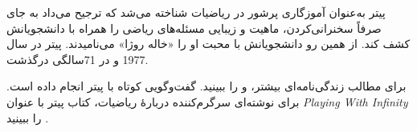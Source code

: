 \documentclass[../../../include/open-logic-section]{subfiles}
\begin{document}
پیتر به‌عنوان آموزگاری پرشور در ریاضیات شناخته می‌شد که ترجیح می‌داد
به جای صرفاً سخنرانی‌کردن، ماهیت و زیبایی مسئله‌های ریاضی را همراه با
دانشجویانش کشف کند. از همین رو دانشجویانش با محبت او را «خاله روژا»
می‌نامیدند. پیتر در سال 1977 و در 71سالگی درگذشت.

\begin{reading}
برای مطالب زندگی‌نامه‌ای بیشتر، \citep{Oconnor2014} و
\citep{Andrasfai1986} را ببینید. \citet{Tamassy1994} گفت‌وگویی کوتاه
با پیتر انجام داده است. برای نوشته‌ای سرگرم‌کننده دربارهٔ ریاضیات،
کتاب پیتر با عنوان \emph{Playing With Infinity} را ببینید
\citep{Peter2010}.
\end{reading}
\end{document}
